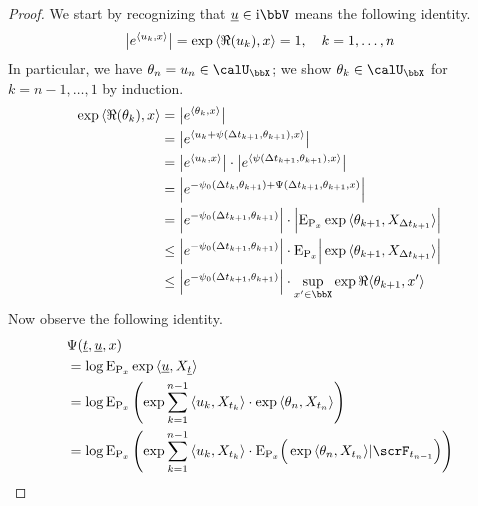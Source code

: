 \begin{proof}
  \label{proof:proposition:aff-fdds-complex}
  We start by recognizing that $\underline\momentVar \in \im\vecSpace$ means the following identity.
  \begin{equation*}
    \big| e^{\langle u_k , x \rangle} \big| = \exp{\langle \Re(u_k) , x\rangle} = 1, \quad k = 1, \ldots, n
  \end{equation*}
  In particular, we have $\twistVar_n = \momentVar_n \in \boundedSpace$; we show $\twistVar_k \in \boundedSpace$ for $k = n-1,\ldots, 1$ by induction.
  \begin{align*}
    \exp\prj{\Re(\twistVar_k)}{\stateVar} 
    &= \big| e^\prj{\twistVar_k}{\stateVar} \big|  \\
    &= \big| e^\prj{\momentVar_k + \affPart(\Delta t_{k+1}, \twistVar_{k+1})}{\stateVar} \big| \\
    &= \big| e^\prj{\momentVar_k}{\stateVar} \big| \cdot \big| e^\prj{\affPart(\Delta t_{k+1}, \twistVar_{k+1})}{\stateVar} \big| \\
    &= \Big| e^{-\affPart_0(\Delta t_k, \twistVar_{k+1}) + \aff(\Delta t_{k+1}, \twistVar_{k+1}, \stateVar)} \Big| \\
    &= \Big| e^{-\affPart_0(\Delta t_{k+1}, \twistVar_{k+1})} \Big| \cdot \Big| \Exp_{\Prb_\stateVar}\exp\prj{\twistVar_{k+1}}{\X_{\Delta t_{k+1}}}  \Big| \\
    &\leq \Big| e^{-\affPart_0(\Delta t_{k+1}, \twistVar_{k+1})} \Big| \cdot \Exp_{\Prb_\stateVar} \Big| \exp\prj{\twistVar_{k+1}}{\X_{\Delta t_{k+1}}}  \Big| \\
    &\leq \Big| e^{-\affPart_0(\Delta t_{k+1}, \twistVar_{k+1})} \Big| \cdot \sup_{\stateVar'\in\stateSpace} \exp\Re\prj{\twistVar_{k+1}}{\stateVar'} 
  \end{align*}
  Now observe the following identity.
  \begin{align}
    \notag
    &\aff(\underline t, \underline\momentVar, \stateVar) \\
    \notag
    &=\log\Exp_{\Prb_\stateVar} \exp\prj{\underline\momentVar}{\X_{\underline t}} \\
    \label{eq:complex-tower-start}
    &= \log\Exp_{\Prb_\stateVar}\left( \exp\sum_{k=1}^{n-1} \prj{\momentVar_k}{\X_{t_k}} \cdot \exp\prj{\twistVar_n}{\X_{t_n}} \right) \\
    \notag
    &= \log\Exp_{\Prb_\stateVar}\left( \exp\sum_{k=1}^{n-1} \prj{\momentVar_k}{\X_{t_k}} \cdot \Exp_{\Prb_\stateVar}\Big(\exp\prj{\twistVar_n}{\X_{t_n}} |\scrF_{t_{n-1}} \Big) \right) \\

\end{align}
\end{proof}

